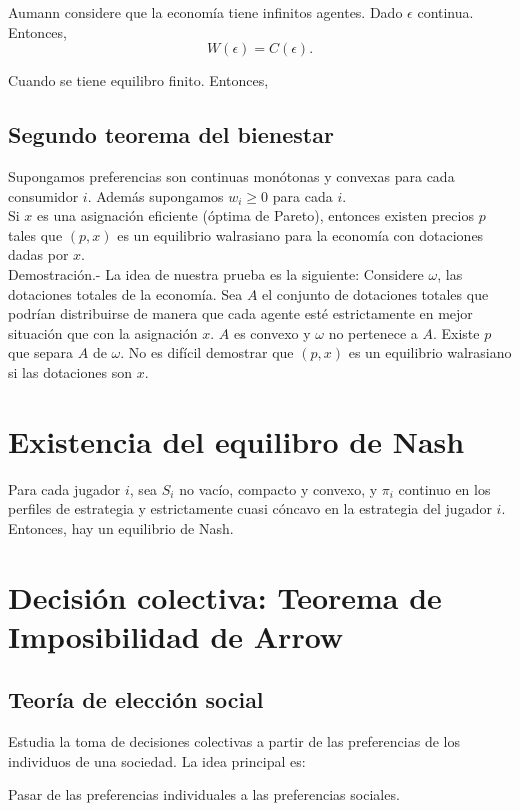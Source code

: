 Aumann considere que la economía tiene infinitos agentes. Dado $\epsilon$ continua. Entonces,
$$W(\epsilon)=C(\epsilon).$$

Cuando se tiene equilibro finito. Entonces,

\section{Segundo teorema del bienestar}
\begin{teo}
    Supongamos preferencias son continuas monótonas y convexas para cada consumidor $i$. Además supongamos $w_i\geq 0$ para cada $i$.\\

    Si $x$ es una asignación eficiente (óptima de Pareto), entonces existen precios $p$ tales que $(p, x)$ es un equilibrio walrasiano para la economía con dotaciones dadas por $x$.\\

	Demostración.-\; La idea de nuestra prueba es la siguiente: Considere $\omega$, las dotaciones totales de la economía. Sea $A$ el conjunto de dotaciones totales que podrían distribuirse de manera que cada agente esté estrictamente en mejor situación que con la asignación $x$. $A$ es convexo y $\omega$ no pertenece a $A$. Existe $p$ que separa $A$ de $\omega$. No es difícil demostrar que $(p, x)$ es un equilibrio walrasiano si las dotaciones son $x$.
\end{teo}


\chapter{Existencia del equilibro de Nash}
\begin{teo} Para cada jugador $i$, sea $S_i$ no vacío, compacto y convexo, y $\pi_i$ continuo en los perfiles de estrategia y estrictamente cuasi cóncavo en la estrategia del jugador $i$. Entonces, hay un equilibrio de Nash.
\end{teo}


\chapter{Decisión colectiva: Teorema de Imposibilidad de Arrow}

\section{Teoría de elección social}
Estudia la toma de decisiones colectivas a partir de las preferencias de los individuos de una sociedad. La idea principal es:
\begin{center}
    Pasar de las preferencias individuales a las preferencias sociales.
\end{center}

